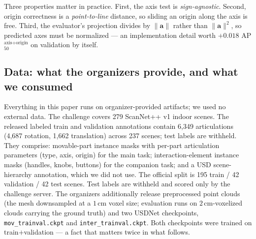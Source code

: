 \documentclass[11pt]{article}
\newcommand{\metric}{AP$_{50}^{\text{axis+origin}}$}
\begin{document}
Three properties matter in practice. First, the axis test is
\emph{sign-agnostic}. Second, origin correctness is a \emph{point-to-line}
distance, so sliding an origin along the axis is free. Third, the
evaluator's projection divides by $\|\mathbf{a}\|$ rather than
$\|\mathbf{a}\|^2$, so predicted axes must be normalized --- an implementation
detail worth $+0.018$ \metric{} on validation by itself.

\subsection{Data: what the organizers provide, and what we consumed}
\label{sec:data}

Everything in this paper runs on organizer-provided artifacts; we used no
external data. The challenge covers 279 ScanNet++ v1 indoor scenes. The
released labeled train and validation annotations contain 6,349 articulations
(4,687 rotation, 1,662 translation) across 237 scenes; test labels are
withheld. They comprise: movable-part instance masks with per-part articulation parameters
(type, axis, origin) for the main task; interaction-element instance masks
(handles, knobs, buttons) for the companion task; and a USD scene-hierarchy
annotation, which we did not use. The official split is 195 train / 42
validation / 42 test scenes. Test labels are withheld and scored only by the
challenge server. The organizers additionally release preprocessed point
clouds (the mesh downsampled at a $1$\,cm voxel size; evaluation runs on
$2$\,cm-voxelized clouds carrying the ground truth) and two USDNet
checkpoints, \texttt{mov\_trainval.ckpt} and \texttt{inter\_trainval.ckpt}.
Both checkpoints were trained on train$+$validation --- a fact that matters
twice in what follows.
\end{document}
